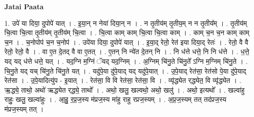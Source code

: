 \documentclass[17pt]{extarticle}
\begin{document}
\textbf{Jatai Paata} \newline

1. उपे॑ या दिया॒ दुपोपे॑ यात् । . इ॒या॒न् न नेया॑ दिया॒न् न । . न तृ॒तीय॑म् तृ॒तीय॒म् न न तृ॒तीय᳚म् । . तृ॒तीय॑म् चि॒त्वा चि॒त्वा तृ॒तीय॑म् तृ॒तीय॑म् चि॒त्वा । . चि॒त्वा काम् काम् चि॒त्वा चि॒त्वा काम् । . काम् च॒न च॒न काम् काम् च॒न । . च॒नोपोप॑ च॒न च॒नोप॑ । . उपे॑या दिया॒ दुपोपे॑ यात् । . इ॒या॒द् रेतो॒ रेत॑ इया दिया॒द् रेतः॑ । . रेतो॒ वै वै रेतो॒ रेतो॒ वै । . वा ए॒त दे॒तद् वै वा ए॒तत् । . ए॒तन् नि न्ये॑त दे॒तन् नि । . नि ध॑त्ते धत्ते॒ नि नि ध॑त्ते । . ध॒त्ते॒ यद् यद् ध॑त्ते धत्ते॒ यत् । . यद॒ग्नि म॒ग्निं ॅयद् यद॒ग्निम् । . अ॒ग्निम् चि॑नु॒ते चि॑नु॒ते᳚ ऽग्नि म॒ग्निम् चि॑नु॒ते । . चि॒नु॒ते यद् यच् चि॑नु॒ते चि॑नु॒ते यत् । . यदु॑पे॒या दु॑पे॒याद् यद् यदु॑पे॒यात् । . उ॒पे॒याद् रेत॑सा॒ रेत॑सो पे॒या दु॑पे॒याद् रेत॑सा । . उ॒पे॒यादित्यु॑प - इ॒यात् । . रेत॑सा॒ वि वि रेत॑सा॒ रेत॑सा॒ वि । . व्यृ॑द्ध्येत र्‌द्ध्येत॒ वि व्यृ॑द्ध्येत । . ऋ॒द्ध्ये॒ ताथो॒ अथो॑ ऋद्ध्येत र्‌द्ध्ये॒ ताथो᳚ । . अथो॒ खलु॒ खल्वथो॒ अथो॒ खलु॑ । . अथो॒ इत्यथो᳚ । . खल्वा॑हु राहुः॒ खलु॒ खल्वा॑हुः । . आ॒हु॒ र॒प्र॒ज॒स्य म॑प्रज॒स्य मा॑हु राहु रप्रज॒स्यम् । . अ॒प्र॒ज॒स्यम् तत् तद॑प्रज॒स्य म॑प्रज॒स्यम् तत् । \newline
\end{document}
